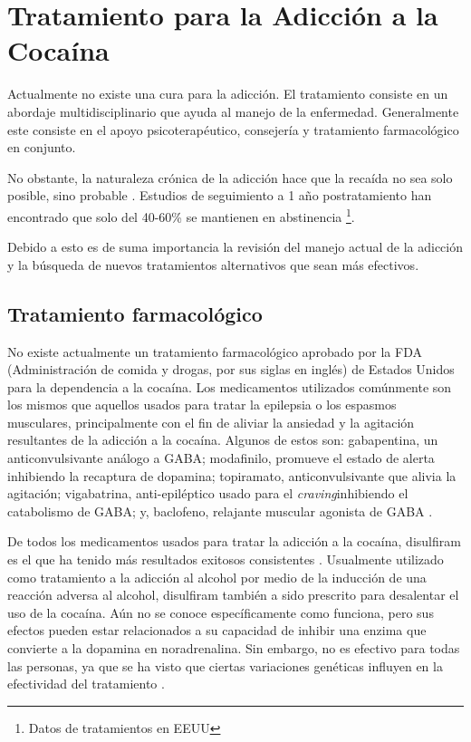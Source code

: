 \section{Tratamiento para la Adicción a la Cocaína}
Actualmente no existe una cura para la adicción.
El tratamiento consiste en un abordaje multidisciplinario que ayuda al manejo de la enfermedad.
Generalmente este consiste en el apoyo psicoterapéutico, consejería y tratamiento farmacológico en conjunto. \par
No obstante, la naturaleza crónica de la adicción hace que la recaída no sea solo posible, sino probable \parencite{NIDA.}.
Estudios de seguimiento a 1 año postratamiento han encontrado que solo del 40-60\% se mantienen en abstinencia \parencite{McLellan1980} \footnote{Datos de tratamientos en EEUU}.\par
Debido a esto es de suma importancia la revisión del manejo actual de la adicción y la búsqueda de nuevos tratamientos alternativos que sean más efectivos.

\subsection{Tratamiento farmacológico}
No existe actualmente un tratamiento farmacológico aprobado por la FDA (Administración de comida y drogas, por sus siglas en inglés) de Estados Unidos para la dependencia a la cocaína.
Los medicamentos utilizados comúnmente son los mismos que aquellos usados para tratar la epilepsia o los espasmos musculares, principalmente con el fin de aliviar la ansiedad y la agitación resultantes de la adicción a la cocaína.
Algunos de estos son: gabapentina, un anticonvulsivante análogo a GABA; modafinilo, promueve el estado de alerta inhibiendo la recaptura de dopamina; topiramato, anticonvulsivante que alivia la agitación; vigabatrina, anti-epiléptico usado para el \textit{craving}inhibiendo el catabolismo de GABA; y, baclofeno, relajante muscular agonista de GABA \parencite{Volkow2007b}.\par
De todos los medicamentos usados para tratar la adicción a la cocaína, disulfiram es el que ha tenido más resultados exitosos consistentes \parencite{Volkow2007b}.
Usualmente utilizado como tratamiento a la adicción al alcohol por medio de la inducción de una reacción adversa al alcohol, disulfiram también a sido prescrito para desalentar el uso de la cocaína.
Aún no se conoce específicamente como funciona, pero sus efectos pueden estar relacionados a su capacidad de inhibir una enzima que convierte a la dopamina en noradrenalina.
Sin embargo, no es efectivo para todas las personas, ya que se ha visto que ciertas variaciones genéticas influyen en la efectividad del tratamiento \parencite{Gaval-Cruz2009a, Volkow2007b}.\par

